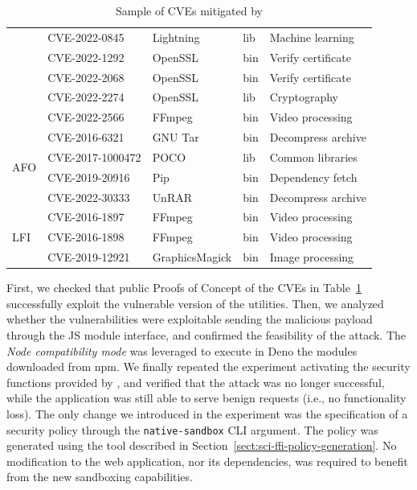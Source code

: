\begin{table}[!t]
\begin{tabular*}{\columnwidth}{ l l l l l}
							& CVE-2022-0845    & Lightning      & lib & Machine learning    \\
						    & CVE-2022-1292    & OpenSSL        & bin & Verify certificate  \\
						    & CVE-2022-2068    & OpenSSL        & bin & Verify certificate  \\
						    & CVE-2022-2274    & OpenSSL        & lib & Cryptography        \\
						    & CVE-2022-2566    & FFmpeg         & bin & Video processing    \\
	  \midrule
	  \multirow{4}{*}{AFO}  & CVE-2016-6321    & GNU Tar        & bin & Decompress archive  \\
							& CVE-2017-1000472 & POCO           & lib & Common libraries    \\
						    & CVE-2019-20916   & Pip            & bin & Dependency fetch    \\
						    & CVE-2022-30333   & UnRAR          & bin & Decompress archive  \\
	  \midrule
	  \multirow{3}{*}{LFI}  & CVE-2016-1897    & FFmpeg         & bin & Video processing    \\
						    & CVE-2016-1898    & FFmpeg         & bin & Video processing    \\
						    & CVE-2019-12921   & GraphicsMagick & bin & Image processing    \\
	  \bottomrule
	\end{tabular*}
	\caption{\label{table-cve} Sample of CVEs mitigated by \pap}
\end{table}


First, we checked that public Proofs of Concept of the CVEs in
Table~\ref{table-cve} successfully exploit the vulnerable version of
the utilities. Then, we analyzed whether the vulnerabilities were
exploitable sending the malicious payload through the JS module
interface, and confirmed the feasibility of the attack. The {\em Node
  compatibility mode} was leveraged to execute in Deno the modules
downloaded from npm. We finally repeated the experiment activating the
security functions provided by \pap, and verified that the attack was
no longer successful, while the application was still able to serve
benign requests (i.e., no functionality loss). The only change we
introduced in the experiment was the specification of a security
policy through the {\tt native-sandbox} CLI argument. The policy was
generated using the tool described in
Section~\ref{sect:sci-ffi-policy-generation}. No modification to the
web application, nor its dependencies, was required to benefit from
the new sandboxing capabilities.


